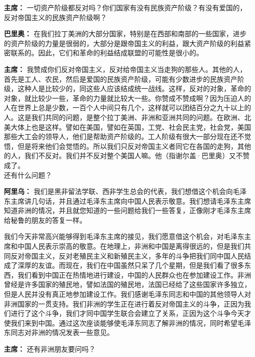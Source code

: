 \begin{list}{}
\item[\textbf{主席：}] 一切资产阶级都反对吗？你们国家有没有民族资产阶级？有没有爱国的，反对帝国主义的民族资产阶级啊？

\item[\textbf{巴里奥：}] 在我们拉丁美洲的大部分国家，特别是在西部和南部的一些国家，进步的资产阶级的力量是很弱的，大部分是跟帝国主义的利益，跟大资产阶级的利益紧密联系的。因此，它们和革命的利益结成联盟的可能性是很小的。

\item[\textbf{主席：}] 我赞成你们反对帝国主义，反对给帝国主义当走狗的那些人。其他的人，首先是工人、农民，然后是爱国的民族资产阶级，可能有少数进步的民族资产阶级，这种人是比较少的，同这些人应该结成统一战线。这样，反对的对象，革命的对象，就比较少一些，革命的力量就比较大一些。你赞成不赞成啊？因为压迫人的人在世界上总是少数，一百个人中间只有几个，这样就可以团结百分之九十以上的人。这是我们共同的问题，是整个拉丁美洲、非洲和亚洲共同的问题。在欧洲、北美大体上也是这样。譬如在美国，譬如在英国，工党、社会民主党，社会党，美国那些大工会的领导人，他们是帮助资产阶级的。工人阶级有很大一部分现在还不觉悟，但是将来他们会觉悟的。所以我们只反对帝国主义者同它在各国的走狗，其他的人，我们不反对。我们并不反对整个美国人嘛。他（指谢尔盖·巴里奥）又不赞成了。\\
还有什么问题？

\item[\textbf{阿里乌：}] 我们是黑非留法学联、西非学生总会的代表，我们想借这个机会向毛泽东主席讲几句话，并且通过毛泽东主席向中国人民表示敬意。我们想请毛泽东主席知道非洲的情况，并且就您知道的一些问题给我们一些答复，正像刚才毛泽东主席给秘鲁的朋友的答复一样。

我们今天非常高兴能够得到毛泽东主席的接见，我们愿意借这个机会，对毛泽东主席和中国人民表示崇高的敬意。在地理上，非洲和中国是离得很远的，但是我们共同反对帝国主义，反对老殖民主义和新殖民主义，多年的斗争把我们同中国人民结成了深厚的友谊。而现在，我们在中国虽然只呆了几个星期，但是我们看了很多东西，我们看到中国正在热情地进行建设，中国的人民群众也在参加建设工作。非洲曾经是许多国家的殖民地，譬如法国的殖民地，法国已经给了这些国家许多独立，但是人民并没有真正地参加建设工作。我们感谢毛泽东同志和中国的其他领导人对非洲国家的一贯支持。我们非洲的学生正在进行着反对帝国主义的斗争，正因为我们进行了这个斗争，我们才同中国学生联合会建立了关系，正因为这个斗争今天才使我们来到中国。通过这次座谈能够使毛泽东同志了解非洲的情况，同时希望毛泽东同志对非洲的情况发表一些意见。

\item[\textbf{主席：}] 还有非洲朋友要问吗？


\end{list}
